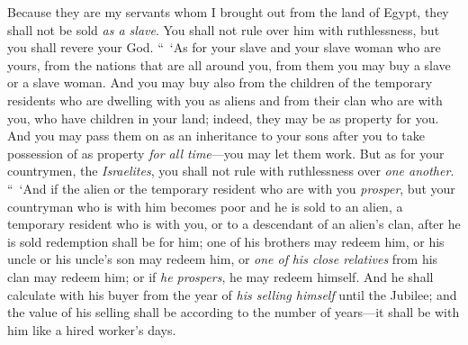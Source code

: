 \begin{biblechapter}
\verse Because they are my servants whom I brought out from the land of Egypt, they shall not be sold \textit{as a slave}.
\verse You shall not rule over him with ruthlessness, but you shall revere your God.
\verse “ ‘As for your slave and your slave woman who are yours, from the nations that are all around you, from them you may buy a slave or a slave woman.
\verse And you may buy also from the children of the temporary residents who are dwelling with you as aliens and from their clan who are with you, who have children in your land; indeed, they may be as property for you.
\verse And you may pass them on as an inheritance to your sons after you to take possession of as property \textit{for all time}—you may let them work. But as for your countrymen, the \textit{Israelites}, you shall not rule with ruthlessness over \textit{one another}.
\verse “ ‘And if the alien or the temporary resident who are with you \textit{prosper}, but your countryman who is with him becomes poor and he is sold to an alien, a temporary resident who is with you, or to a descendant of an alien’s clan,
\verse after he is sold redemption shall be for him; one of his brothers may redeem him,
\verse or his uncle or his uncle’s son may redeem him, or \textit{one of} \textit{his close relatives} from his clan may redeem him; or if \textit{he prospers}, he may redeem himself.
\verse And he shall calculate with his buyer from the year of \textit{his selling himself} until the Jubilee; and the value of his selling shall be according to the number of years—it shall be with him like a hired worker’s days.

\end{biblechapter}
